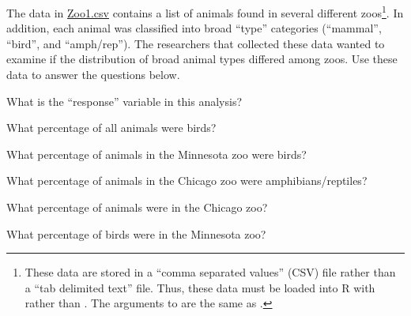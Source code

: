 \documentclass[10pt,openany]{book}\usepackage[]{graphicx}\usepackage[]{color}
\begin{document}
\begin{exsection}
  \item \label{revex:cbEDAZoo1} \rhw{} The data in \href{}{Zoo1.csv} contains a list of animals found in several different zoos\footnote{These data are stored in a ``comma separated values'' (CSV) file rather than a ``tab delimited text'' file.  Thus, these data must be loaded into R with  rather than .  The arguments to  are the same as .}.  In addition, each animal was classified into broad ``type'' categories (``mammal'', ``bird'', and ``amph/rep'').  The researchers that collected these data wanted to examine if the distribution of broad animal types differed among zoos.  Use these data to answer the questions below.
  \begin{Enumerate}
    \item What is the ``response'' variable in this analysis?
    \item What percentage of all animals were birds?
    \item What percentage of animals in the Minnesota zoo were birds?
    \item What percentage of animals in the Chicago zoo were amphibians/reptiles?
    \item What percentage of animals were in the Chicago zoo?
    \item What percentage of birds were in the Minnesota zoo?
  \end{Enumerate}
\end{exsection}
\end{document}
